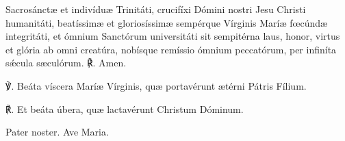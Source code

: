 \vspace{0.5ex}

Sacrosánctæ et indivíduæ Trinitáti, crucifíxi Dómini nostri Jesu Christi humanitáti, beatíssimæ et gloriosíssimæ sempérque Vírginis Maríæ fœcúndæ integritáti, et ómnium Sanctórum universitáti sit sempitérna laus, honor, virtus et glória ab omni creatúra, nobísque remíssio ómnium peccatórum, per infiníta sǽcula sæculórum. ℟. Amen.

℣. Beáta víscera Maríæ Vírginis, quæ portavérunt ætérni Pátris Fílium.

℟. Et beáta úbera, quæ lactavérunt Christum Dóminum.

Pater noster. Ave Maria.
